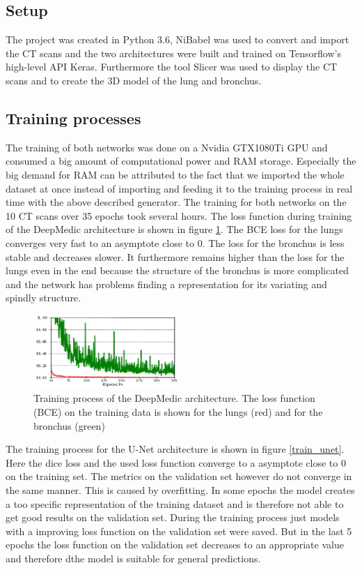 
\subsection{Setup}

The project was created in Python 3.6, NiBabel was used to convert and import the CT scans and the two architectures were built and trained on Tensorflow's high-level API Keras. Furthermore the tool Slicer was used to display the CT scans and to create the 3D model of the lung and bronchus.

\subsection{Training processes}
The training of both networks was done on a Nvidia GTX1080Ti GPU and consumed a big amount of computational power and RAM storage. Especially the big demand for RAM can be attributed to the fact that we imported the whole dataset at once instead of importing and feeding it to the training process in real time with the above described generator. The training for both networks on the 10 CT scans over 35 epochs took several hours.\newline 
The loss function during training of the DeepMedic architecture is shown in figure \ref{train_deepmedic}. The BCE loss for the lungs converges very fast to an asymptote close to 0. The loss for the bronchus is less stable and decreases slower. It furthermore remains higher than the loss for the lungs even in the end because the structure of the bronchus is more complicated and the network has problems finding a representation for its variating and spindly structure.\newline
\begin{figure}[h!]
	\includegraphics[width=0.49\textwidth, angle=0]{files/deepmedictrain.png}
	\caption{Training process of the DeepMedic architecture. The loss function (BCE) on the training data is shown for the lungs (red) and for the bronchus (green)}
	\label{train_deepmedic}
\end{figure}

The training process for the U-Net architecture is shown in figure \ref{train_unet}. Here the dice loss and the used loss function converge to a asymptote close to 0 on the training set. The metrics on the validation set however do not converge in the same manner. This is caused by overfitting. In some epochs the model creates a too specific representation of the training dataset and is therefore not able to get good results on the validation set. During the training process just models with a improving loss function on the validation set were saved. But in the last 5 epochs the loss function on the validation set decreases to an appropriate value and therefore dthe model is suitable for general predictions. 

